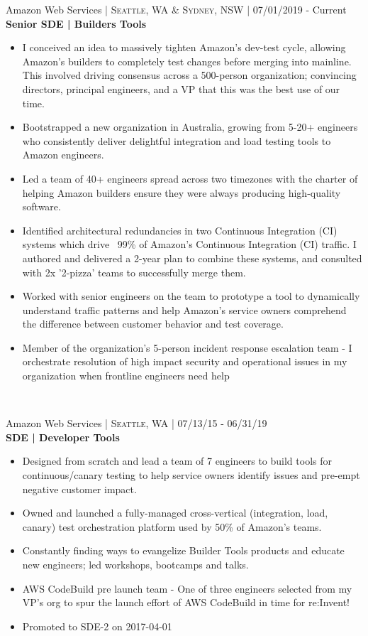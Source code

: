 \documentclass[10pt]{article} %
\begin{document}
{{\raggedright\large Amazon Web Services \normalsize\textsc{ | Seattle, WA & Sydney, NSW} | 07/01/2019 - Current\\
\textbf{Senior SDE | Builders Tools}\\[5pt]}
\begin{itemize}\itemsep-0.25em
    \item I conceived an idea to massively tighten Amazon's dev-test cycle, allowing Amazon's builders to completely test changes before merging into mainline. This involved driving consensus across a 500-person organization; convincing directors, principal engineers, and a VP that this was the best use of our time.
    \item Bootstrapped a new organization in Australia, growing from 5-20+ engineers who consistently deliver delightful integration and load testing tools to Amazon engineers.
    \item Led a team of 40+ engineers spread across two timezones with the charter of helping Amazon builders ensure they were always producing high-quality software.
    \item Identified architectural redundancies in two Continuous Integration (CI) systems which drive ~99\% of Amazon's Continuous Integration (CI) traffic. I authored and delivered a 2-year plan to combine these systems, and consulted with 2x '2-pizza' teams to successfully merge them.
    \item Worked with senior engineers on the team to prototype a tool to dynamically understand traffic patterns and help Amazon's service owners comprehend the difference between customer behavior and test coverage.
    \item Member of the organization's 5-person incident response escalation team - I orchestrate resolution of high impact security and operational issues in my organization when frontline engineers need help
\end{itemize}\\


{\raggedright\large Amazon Web Services \normalsize\textsc{ | Seattle, WA} | 07/13/15 - 06/31/19\\
\textbf{SDE | Developer Tools}\\[5pt]}
\begin{itemize}\itemsep-0.25em
    \item Designed from scratch and lead a team of 7 engineers to build tools for continuous/canary testing to help service owners identify issues and pre-empt negative customer impact.
    \item Owned and launched a fully-managed cross-vertical (integration, load, canary) test orchestration platform used by 50\% of Amazon's teams.
    \item Constantly finding ways to evangelize Builder Tools products and educate new engineers; led workshops, bootcamps and talks.
    \item AWS CodeBuild pre launch team - One of three engineers selected from my VP's org to spur the launch effort of AWS CodeBuild in time for re:Invent!
    \item Promoted to SDE-2 on 2017-04-01
\end{itemize}\\

}
\end{document}
